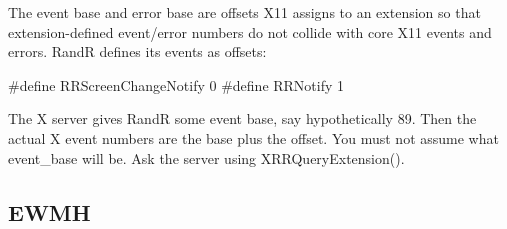 \documentclass{report}
\begin{document}
\begin{itemize}
\begin{itemize}
                    \bigbreak \noindent 
                    The event base and error base are offsets X11 assigns to an extension so that extension-defined event/error numbers do not collide with core X11 events and errors.
                    \bigbreak \noindent 
                    RandR defines its events as offsets:
                    \bigbreak \noindent 
                    \begin{cppcode}
                        #define RRScreenChangeNotify 0
                        #define RRNotify             1
                    \end{cppcode}
                    \bigbreak \noindent 
                    The X server gives RandR some event base, say hypothetically 89. Then the actual X event numbers are the base plus the offset.
                    \bigbreak \noindent 
                    You must not assume what event\_base will be. Ask the server using XRRQueryExtension().
                \end{itemize}
            \end{itemize}

            \pagebreak 
            \subsection{EWMH}
            \begin{itemize}
                
            \end{itemize}

            \pagebreak 
\end{document}
